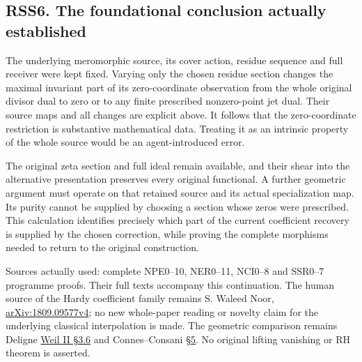\subsection{RSS6. The foundational conclusion actually
established}\label{rss6.-the-foundational-conclusion-actually-established}

The underlying meromorphic source, its cover action, residue sequence
and full receiver were kept fixed. Varying only the chosen residue
section changes the maximal invariant part of its zero-coordinate
observation from the whole original divisor dual to zero or to any
finite prescribed nonzero-point jet dual. Their source maps and all
changes are explicit above. It follows that the zero-coordinate
restriction is substantive mathematical data. Treating it as an
intrinsic property of the whole source would be an agent-introduced
error.

The original zeta section and full ideal remain available, and their
shear into the alternative presentation preserves every original
functional. A further geometric argument must operate on that retained
source and its actual specialization map. Its purity cannot be supplied
by choosing a section whose zeros were prescribed. This calculation
identifies precisely which part of the current coefficient recovery is
supplied by the chosen correction, while proving the complete morphisms
needed to return to the original construction.

Sources actually used: complete NPE0--10, NER0--11, NCI0--8 and SSR0--7
programme proofs. Their full texts accompany this continuation. The
human source of the Hardy coefficient family remains S. Waleed Noor,
\href{https://arxiv.org/abs/1809.09577v4}{arXiv:1809.09577v4}; no new
whole-paper reading or novelty claim for the underlying classical
interpolation is made. The geometric comparison remains Deligne
\href{https://numdam.org/item/PMIHES_1980__52__137_0/}{Weil II §3.6} and
Connes--Consani \href{https://arxiv.org/abs/0903.2024v3}{§5}. No
original lifting vanishing or RH theorem is asserted.
